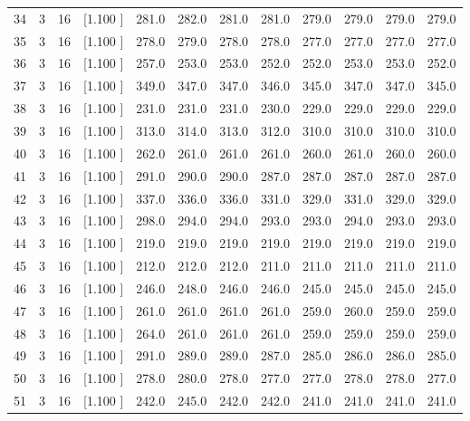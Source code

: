 \documentclass[12pt,a4paper]{article}
\begin{document}
\begin{center}
{\begin{tabular}{r r r r r r r r r r r r}
  34&  3& 16&[1.100     ]&   281.0&   282.0&   281.0&   281.0&   279.0&   279.0&   279.0&   279.0\\[-0.02in]
  35&  3& 16&[1.100     ]&   278.0&   279.0&   278.0&   278.0&   277.0&   277.0&   277.0&   277.0\\[-0.02in]
  36&  3& 16&[1.100     ]&   257.0&   253.0&   253.0&   252.0&   252.0&   253.0&   253.0&   252.0\\[-0.02in]
  37&  3& 16&[1.100     ]&   349.0&   347.0&   347.0&   346.0&   345.0&   347.0&   347.0&   345.0\\[-0.02in]
  38&  3& 16&[1.100     ]&   231.0&   231.0&   231.0&   230.0&   229.0&   229.0&   229.0&   229.0\\[-0.02in]
  39&  3& 16&[1.100     ]&   313.0&   314.0&   313.0&   312.0&   310.0&   310.0&   310.0&   310.0\\[-0.02in]
  40&  3& 16&[1.100     ]&   262.0&   261.0&   261.0&   261.0&   260.0&   261.0&   260.0&   260.0\\[-0.02in]
  41&  3& 16&[1.100     ]&   291.0&   290.0&   290.0&   287.0&   287.0&   287.0&   287.0&   287.0\\[-0.02in]
  42&  3& 16&[1.100     ]&   337.0&   336.0&   336.0&   331.0&   329.0&   331.0&   329.0&   329.0\\[-0.02in]
  43&  3& 16&[1.100     ]&   298.0&   294.0&   294.0&   293.0&   293.0&   294.0&   293.0&   293.0\\[-0.02in]
  44&  3& 16&[1.100     ]&   219.0&   219.0&   219.0&   219.0&   219.0&   219.0&   219.0&   219.0\\[-0.02in]
  45&  3& 16&[1.100     ]&   212.0&   212.0&   212.0&   211.0&   211.0&   211.0&   211.0&   211.0\\[-0.02in]
  46&  3& 16&[1.100     ]&   246.0&   248.0&   246.0&   246.0&   245.0&   245.0&   245.0&   245.0\\[-0.02in]
  47&  3& 16&[1.100     ]&   261.0&   261.0&   261.0&   261.0&   259.0&   260.0&   259.0&   259.0\\[-0.02in]
  48&  3& 16&[1.100     ]&   264.0&   261.0&   261.0&   261.0&   259.0&   259.0&   259.0&   259.0\\[-0.02in]
  49&  3& 16&[1.100     ]&   291.0&   289.0&   289.0&   287.0&   285.0&   286.0&   286.0&   285.0\\[-0.02in]
  50&  3& 16&[1.100     ]&   278.0&   280.0&   278.0&   277.0&   277.0&   278.0&   278.0&   277.0\\[-0.02in]
  51&  3& 16&[1.100     ]&   242.0&   245.0&   242.0&   242.0&   241.0&   241.0&   241.0&   241.0\\[-0.02in]

\end{tabular}}
\end{center}
\end{document}

